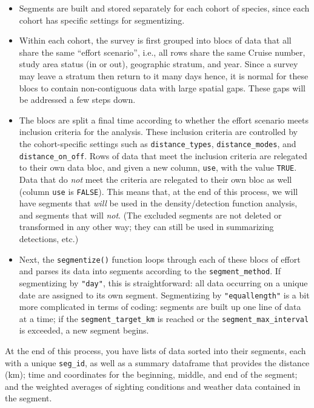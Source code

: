 \documentclass[
]{book}
\begin{document}
\begin{itemize}
\item
  Segments are built and stored separately for each cohort of species, since each cohort has specific settings for segmentizing.
\item
  Within each cohort, the survey is first grouped into blocs of data that all share the same ``effort scenario'', i.e., all rows share the same Cruise number, study area status (in or out), geographic stratum, and year. Since a survey may leave a stratum then return to it many days hence, it is normal for these blocs to contain non-contiguous data with large spatial gaps. These gaps will be addressed a few steps down.
\item
  The blocs are split a final time according to whether the effort scenario meets inclusion criteria for the analysis. These inclusion criteria are controlled by the cohort-specific settings such as \texttt{distance\_types}, \texttt{distance\_modes}, and \texttt{distance\_on\_off}. Rows of data that meet the inclusion criteria are relegated to their own data bloc, and given a new column, \texttt{use}, with the value \texttt{TRUE}. Data that do \emph{not} meet the criteria are relegated to their own bloc as well (column \texttt{use} is \texttt{FALSE}). This means that, at the end of this process, we will have segments that \emph{will} be used in the density/detection function analysis, and segments that will \emph{not}. (The excluded segments are not deleted or transformed in any other way; they can still be used in summarizing detections, etc.)
\item
  Next, the \texttt{segmentize()} function loops through each of these blocs of effort and parses its data into segments according to the \texttt{segment\_method}. If segmentizing by \texttt{"day"}, this is straightforward: all data occurring on a unique date are assigned to its own segment. Segmentizing by \texttt{"equallength"} is a bit more complicated in terms of coding: segments are built up one line of data at a time; if the \texttt{segment\_target\_km} is reached or the \texttt{segment\_max\_interval} is exceeded, a new segment begins.
\end{itemize}

At the end of this process, you have lists of data sorted into their segments, each with a unique \texttt{seg\_id}, as well as a summary dataframe that provides the distance (km); time and coordinates for the beginning, middle, and end of the segment; and the weighted averages of sighting conditions and weather data contained in the segment.
\end{document}
